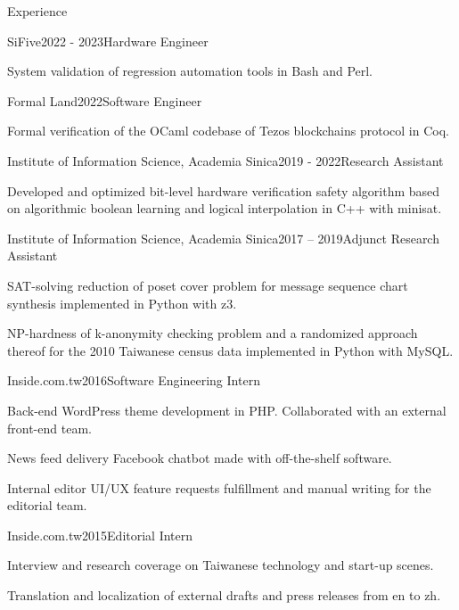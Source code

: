 \documentclass{resume} %
\begin{document}
\begin{rSection}{Experience}

\begin{rSubsection}{SiFive}{2022 - 2023}{Hardware Engineer}{}
\item System validation of regression automation tools in Bash and Perl.
\end{rSubsection}

\begin{rSubsection}{Formal Land}{2022}{Software Engineer}{}
\item Formal verification of the OCaml codebase of Tezos blockchains protocol in Coq.
\end{rSubsection}

\begin{rSubsection}{Institute of Information Science, Academia Sinica}{2019 - 2022}{Research Assistant}{}
\item Developed and optimized bit-level hardware verification safety algorithm
 based on algorithmic boolean learning and logical interpolation in C++ with minisat.
\end{rSubsection}


\begin{rSubsection}{Institute of Information Science, Academia Sinica}{2017 – 2019}{Adjunct Research Assistant}{}
\item SAT-solving reduction of poset cover problem for message sequence chart synthesis  implemented in Python with z3.
\item NP-hardness of k-anonymity checking problem and a randomized approach thereof for the 2010 Taiwanese census data
implemented in Python with MySQL.
\end{rSubsection}


\begin{rSubsection}{Inside.com.tw}{2016}{Software Engineering Intern}{}
\item Back-end WordPress theme development in PHP. Collaborated with an external front-end team.
\item News feed delivery Facebook chatbot made with off-the-shelf software.
\item Internal editor UI/UX feature requests fulfillment and manual writing for the editorial team.
\end{rSubsection}


\begin{rSubsection}{Inside.com.tw}{2015}{Editorial Intern}{}
\item Interview and research coverage on Taiwanese technology and start-up scenes.
\item Translation and localization of external drafts and press releases from en to zh.
\end{rSubsection}

\end{rSection}
\end{document}
